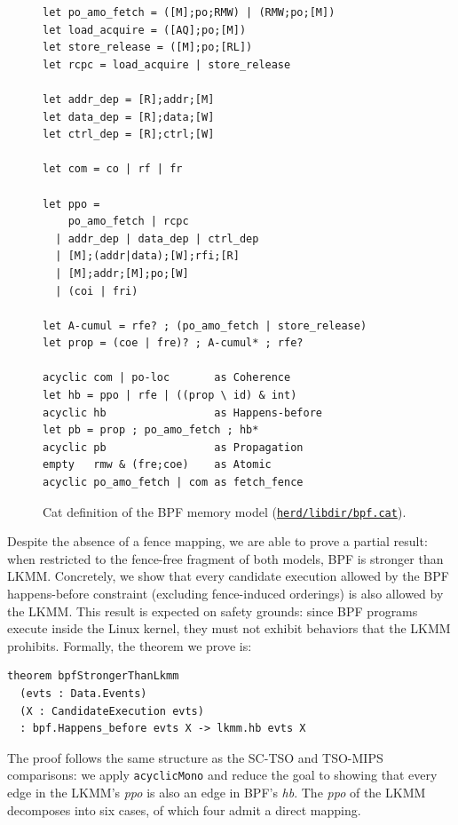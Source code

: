 \begin{figure}[t]
  \centering
  \begin{minipage}{0.95\linewidth}
\begin{verbatim}
let po_amo_fetch = ([M];po;RMW) | (RMW;po;[M])
let load_acquire = ([AQ];po;[M])
let store_release = ([M];po;[RL])
let rcpc = load_acquire | store_release

let addr_dep = [R];addr;[M]
let data_dep = [R];data;[W]
let ctrl_dep = [R];ctrl;[W]

let com = co | rf | fr

let ppo =
    po_amo_fetch | rcpc
  | addr_dep | data_dep | ctrl_dep
  | [M];(addr|data);[W];rfi;[R]
  | [M];addr;[M];po;[W]
  | (coi | fri)

let A-cumul = rfe? ; (po_amo_fetch | store_release)
let prop = (coe | fre)? ; A-cumul* ; rfe?

acyclic com | po-loc       as Coherence
let hb = ppo | rfe | ((prop \ id) & int)
acyclic hb                 as Happens-before
let pb = prop ; po_amo_fetch ; hb*
acyclic pb                 as Propagation
empty   rmw & (fre;coe)    as Atomic
acyclic po_amo_fetch | com as fetch_fence
\end{verbatim}
  \end{minipage}
  \caption{Cat definition of the BPF memory model (\href{https://github.com/herd/herdtools7/blob/master/herd/libdir/bpf.cat}{\texttt{herd/libdir/bpf.cat}}).}
  \label{fig:bpf-definition}
\end{figure}

Despite the absence of a fence mapping, we are able to prove a partial result: when restricted to the fence-free fragment of both models, BPF is stronger than LKMM. Concretely, we show that every candidate execution allowed by the BPF happens-before constraint (excluding fence-induced orderings) is also allowed by the LKMM. This result is expected on safety grounds: since BPF programs execute inside the Linux kernel, they must not exhibit behaviors that the LKMM prohibits. Formally, the theorem we prove is:

\begin{lstlisting}[]
theorem bpfStrongerThanLkmm
  (evts : Data.Events)
  (X : CandidateExecution evts)
  : bpf.Happens_before evts X -> lkmm.hb evts X
\end{lstlisting}

The proof follows the same structure as the SC-TSO and TSO-MIPS comparisons: we apply \texttt{acyclicMono} and reduce the goal to showing that every edge in the LKMM's \textit{ppo} is also an edge in BPF's \textit{hb}. The \textit{ppo} of the LKMM decomposes into six cases, of which four admit a direct mapping.

